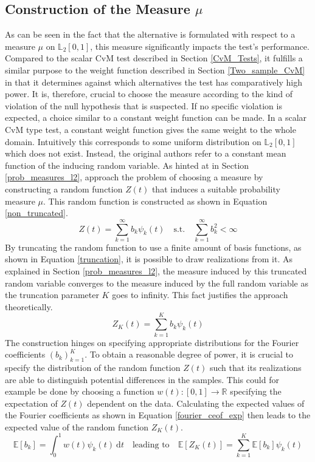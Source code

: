 \documentclass[12pt, a4paper]{article}
\theoremstyle{MAstyle} \newtheorem{assumption}{Assumption}[section]
\theoremstyle{MAstyle} \newtheorem{definition}{Definition}[section]
\theoremstyle{MAstyle} \newtheorem{theorem}{Theorem}[section]
\begin{document}
		\subsection{Construction of the Measure $\mu$}\label{mu}
			As can be seen in the fact that the alternative is formulated with respect to a measure $\mu$ on $\mathbb{L}_2[0,1]$, this measure significantly impacts the test's performance. Compared to the scalar CvM test described in Section \ref{CvM_Tests}, it fulfills a similar purpose to the weight function described in Section \ref{Two_sample_CvM} in that it determines against which alternatives the test has comparatively high power. 
			It is, therefore, crucial to choose the measure according to the kind of violation of the null hypothesis that is suspected. If no specific violation is expected, a choice similar to a constant weight function can be made. 
			In a scalar CvM type test, a constant weight function gives the same weight to the whole domain. 
			Intuitively this corresponds to some uniform distribution on $\mathbb{L}_2[0,1]$ which does not exist. Instead, the original authors refer to a constant mean function of the inducing random variable.
			As hinted at in Section \ref{prob_measures_l2}, \cite{bugni_permutation_2021} approach the problem of choosing a measure by constructing a random function $Z(t)$ that induces a suitable probability measure $\mu$.	
			This random function is constructed as shown in Equation \ref{non_truncated}.
			\begin{equation}\label{non_truncated}
				Z(t) = \sum_{k = 1}^{\infty} b_k \psi_k(t)
				\quad \text{s.t.} \quad
				\sum_{k = 1}^{\infty} b_k^2 < \infty
			\end{equation}
			By truncating the random function to use a finite amount of basis functions, as shown in Equation \ref{truncation}, it is possible to draw realizations from it. As explained in Section \ref{prob_measures_l2}, the measure induced by this truncated random variable converges to the measure induced by the full random variable as the truncation parameter $K$ goes to infinity. This fact justifies the approach theoretically.
			\begin{equation}\label{truncation}
				Z_K(t) = \sum_{k = 1}^{K} b_k \psi_k(t)
			\end{equation}
			The construction hinges on specifying appropriate distributions for the Fourier coefficients $\left(b_k\right)_{k = 1}^{K}$. To obtain a reasonable degree of power, it is crucial to specify the distribution of the random function $Z(t)$ such that its realizations are able to distinguish potential differences in the samples. This could for example be done by choosing a function $w(t):[0,1] \rightarrow \mathbb{R}$ specifying the expectation of $Z(t)$ dependent on the data. 
			Calculating the expected values of the Fourier coefficients as shown in Equation \ref{fourier_ceof_exp} then leads to the expected value of the random function $Z_K(t)$.
			\begin{equation}\label{fourier_ceof_exp}
				\mathbb{E}\left[b_k\right] = \int_{0}^{1}w(t)\psi_k(t) \ \mathrm{d}t
				\quad \text{leading to} \quad
				\mathbb{E}\left[Z_K(t)\right] = \sum_{k = 1}^{K} \mathbb{E}\left[b_k\right] \psi_k(t)
			\end{equation}
		
\end{document}
